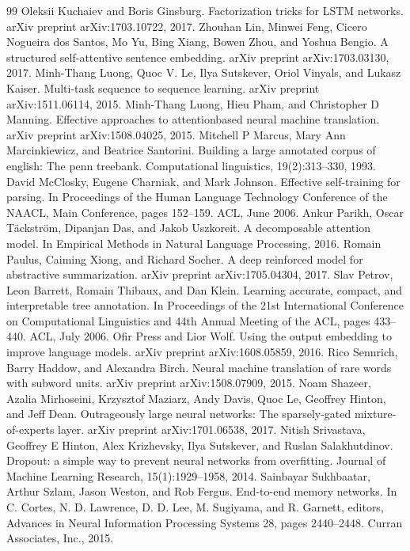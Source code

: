 \documentclass[conference]{IEEEtran}
\begin{document}
\begin{thebibliography}{99}
 Oleksii Kuchaiev and Boris Ginsburg. Factorization tricks for LSTM networks. arXiv preprint arXiv:1703.10722, 2017.
 Zhouhan Lin, Minwei Feng, Cicero Nogueira dos Santos, Mo Yu, Bing Xiang, Bowen Zhou, and Yoshua Bengio. A structured self-attentive sentence embedding. arXiv preprint arXiv:1703.03130, 2017.
 Minh-Thang Luong, Quoc V. Le, Ilya Sutskever, Oriol Vinyals, and Lukasz Kaiser. Multi-task sequence to sequence learning. arXiv preprint arXiv:1511.06114, 2015.
 Minh-Thang Luong, Hieu Pham, and Christopher D Manning. Effective approaches to attentionbased neural machine translation. arXiv preprint arXiv:1508.04025, 2015.
 Mitchell P Marcus, Mary Ann Marcinkiewicz, and Beatrice Santorini. Building a large annotated corpus of english: The penn treebank. Computational linguistics, 19(2):313--330, 1993.
 David McClosky, Eugene Charniak, and Mark Johnson. Effective self-training for parsing. In Proceedings of the Human Language Technology Conference of the NAACL, Main Conference, pages 152--159. ACL, June 2006.
 Ankur Parikh, Oscar Täckström, Dipanjan Das, and Jakob Uszkoreit. A decomposable attention model. In Empirical Methods in Natural Language Processing, 2016.
 Romain Paulus, Caiming Xiong, and Richard Socher. A deep reinforced model for abstractive summarization. arXiv preprint arXiv:1705.04304, 2017.
 Slav Petrov, Leon Barrett, Romain Thibaux, and Dan Klein. Learning accurate, compact, and interpretable tree annotation. In Proceedings of the 21st International Conference on Computational Linguistics and 44th Annual Meeting of the ACL, pages 433--440. ACL, July 2006.
 Ofir Press and Lior Wolf. Using the output embedding to improve language models. arXiv preprint arXiv:1608.05859, 2016.
 Rico Sennrich, Barry Haddow, and Alexandra Birch. Neural machine translation of rare words with subword units. arXiv preprint arXiv:1508.07909, 2015.
 Noam Shazeer, Azalia Mirhoseini, Krzysztof Maziarz, Andy Davis, Quoc Le, Geoffrey Hinton, and Jeff Dean. Outrageously large neural networks: The sparsely-gated mixture-of-experts layer. arXiv preprint arXiv:1701.06538, 2017.
 Nitish Srivastava, Geoffrey E Hinton, Alex Krizhevsky, Ilya Sutskever, and Ruslan Salakhutdinov. Dropout: a simple way to prevent neural networks from overfitting. Journal of Machine Learning Research, 15(1):1929--1958, 2014.
 Sainbayar Sukhbaatar, Arthur Szlam, Jason Weston, and Rob Fergus. End-to-end memory networks. In C. Cortes, N. D. Lawrence, D. D. Lee, M. Sugiyama, and R. Garnett, editors, Advances in Neural Information Processing Systems 28, pages 2440--2448. Curran Associates, Inc., 2015.

\end{thebibliography}
\end{document}
